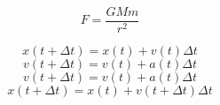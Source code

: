 \documentclass{article}
\begin{document}
\begin{equation}
F = \frac{GMm}{r^2}
\end{equation}

\begin{equation}
x(t+ \Delta t) = x(t) + v(t)\Delta t
\end{equation}
\begin{equation}
v(t+ \Delta t) = v(t) + a(t)\Delta t
\end{equation}
\begin{equation}
v(t+\Delta t) = v(t) + a(t)\Delta t
\end{equation}
\begin{equation}
x(t+ \Delta t) = x(t) + v(t+ \Delta t) \Delta t
\end{equation}
\end{document}
